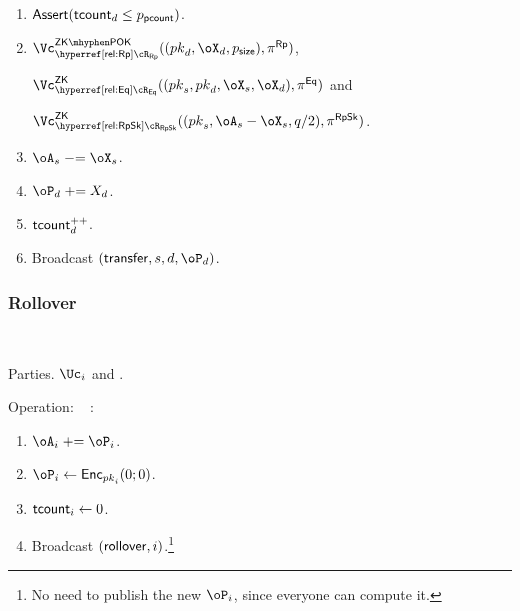 \begin{protocol}
\begin{enumerate}
\begin{enumerate}
			\item  $\mathsf{Assert}(\mathsf{tcount}_d \le p_{\mathsf{pcount}})$.
				
			\item   $\vZKPOK{\rRp}((\pk_d,\oX_d,\psize),\pi^\RPs)$,
			
			 $\vZK{\rEq}((\pk_s,\pk_d,\oX_s,\oX_d),\pi^\Eqs)$ and
			 
			  $\vZK{\rRpSk}((\pk_s,\oA_s-\oX_s,q/2),\pi^\RpSkS)$. 
			
	
		
		
		     \item   $\oA_s\minuseq \oX_s$. 
              
              \item  $\oP_d \pluseq X_d$. 
              
              \item $\mathsf{tcount}_d^{++}$.
              
		     
		     \item Broadcast $(\transfer,s,d,\oP_d)$.
		\end{enumerate}
		
	\end{enumerate}
	
\end{protocol}



\subsubsection{Rollover}

\begin{protocol}~\label{prot:ConfidentialTransactions:Rollover}
	\item[Parties.] $\Uc_i$ and \Cc.
	
\item[Operation:] ~
	\Cc:
	\begin{enumerate}
	
	
		
	\item $\oA_i  \pluseq \oP_i$.
	
	
	\item  $\oP_i \asn \Enc_{\pk_i}(0;0)$.
	
	\item  $\mathsf{tcount}_i \leftarrow 0$.
	
	
	\item  Broadcast $(\mathsf{rollover},i)$.\footnote{No  need to publish  the new $\oP_i$, since everyone can compute it.}
	
	
\end{enumerate}
\end{protocol}



